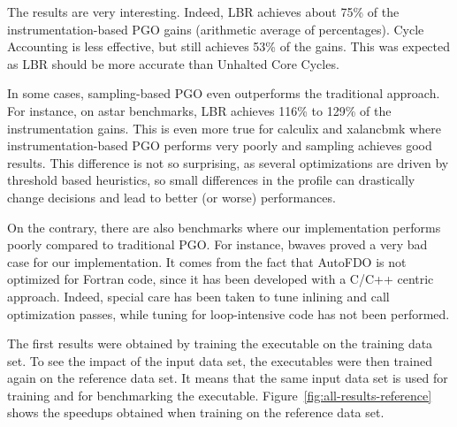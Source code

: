 \documentclass[9pt,english,twocolumn,letter]{article}
\begin{document}
The results are very interesting. Indeed, LBR achieves about 75\% of the instrumentation-based PGO gains (arithmetic average of percentages). Cycle Accounting is less effective, but still achieves 53\% of the gains. This was expected as LBR should be more accurate than Unhalted Core Cycles.

In some cases, sampling-based PGO even outperforms the traditional approach. For instance, on astar benchmarks, LBR achieves 116\% to 129\% of the instrumentation gains. This is even more true for calculix and xalancbmk where instrumentation-based PGO performs very poorly and sampling achieves good results. This difference is not so surprising, as several optimizations are driven by threshold based heuristics, so small differences in the profile can drastically change decisions and lead to better (or worse) performances.

On the contrary, there are also benchmarks where our implementation performs poorly compared to traditional PGO. For instance, bwaves proved a very bad case for our implementation. It comes from the fact that AutoFDO is not optimized for Fortran code, since it has been developed with a C/C++ centric approach. Indeed, special care has been taken to tune inlining and call optimization passes, while tuning for loop-intensive code has not been performed.

The first results were obtained by training the executable on the training data set. To see the impact of the input data set, the executables were then trained again on the reference data set. It means that the same input data set is used for training and for benchmarking the executable. Figure~\ref{fig:all-results-reference} shows the speedups obtained when training on the reference data set.
\end{document}
